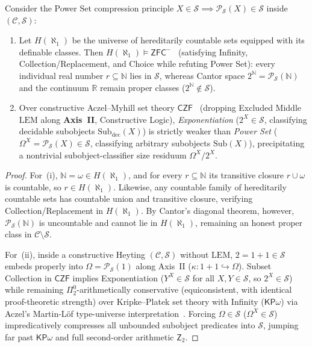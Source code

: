 \begin{proposition}\label{prop:pointillist-continuum}%
%
Consider the Power Set compression principle $X \in \mathcal{S} \implies \mathcal{P}_{\mathcal{S}}(X) \in \mathcal{S}$ inside $(\mathcal{C}, \mathcal{S})$:
\begin{enumerate}[label=\textup{(\roman*)},leftmargin=1.8em]
  \item Let $H(\aleph_1)$ be the universe of hereditarily countable sets equipped with its definable classes. Then $H(\aleph_1) \models \mathsf{ZFC}^-$~\cite{GitmanHamkinsJohnstone16} (satisfying Infinity, Collection/Replacement, and Choice while refuting Power Set): every individual real number $r \subseteq \mathbb{N}$ lies in $\mathcal{S}$, whereas Cantor space $2^{\mathbb{N}} = \mathcal{P}_{\mathcal{S}}(\mathbb{N})$ and the continuum $\mathbb{R}$ remain proper classes ($2^{\mathbb{N}} \notin \mathcal{S}$).
  \item Over constructive Aczel--Myhill set theory $\mathsf{CZF}$~\cite{Aczel78} (dropping Excluded Middle $\mathrm{LEM}$ along \textbf{Axis~II}, Constructive Logic), \emph{Exponentiation} ($2^X \in \mathcal{S}$, classifying decidable subobjects $\mathrm{Sub}_{\mathrm{dec}}(X)$) is strictly weaker than \emph{Power Set} ($\Omega^X = \mathcal{P}_{\mathcal{S}}(X) \in \mathcal{S}$, classifying arbitrary subobjects $\mathrm{Sub}(X)$), precipitating a nontrivial subobject-classifier size residuum $\Omega^X / 2^X$.
\end{enumerate}
\end{proposition}

\begin{proof}
For~(i), $\mathbb{N} = \omega \in H(\aleph_1)$, and for every $r \subseteq \mathbb{N}$ its transitive closure $r \cup \omega$ is countable, so $r \in H(\aleph_1)$. Likewise, any countable family of hereditarily countable sets has countable union and transitive closure, verifying Collection/Replacement in $H(\aleph_1)$. By Cantor's diagonal theorem, however, $\mathcal{P}_{\mathcal{S}}(\mathbb{N})$ is uncountable and cannot lie in $H(\aleph_1)$, remaining an honest proper class in $\mathcal{C} \setminus \mathcal{S}$.

For~(ii), inside a constructive Heyting $(\mathcal{C}, \mathcal{S})$ without $\mathrm{LEM}$, $2 = 1 + 1 \in \mathcal{S}$ embeds properly into $\Omega = \mathcal{P}_{\mathcal{S}}(1)$ along Axis~II ($\kappa : 1 + 1 \hookrightarrow \Omega$). Subset Collection in $\mathsf{CZF}$ implies Exponentiation ($Y^X \in \mathcal{S}$ for all $X, Y \in \mathcal{S}$, so $2^X \in \mathcal{S}$) while remaining $\Pi^0_2$-arithmetically conservative (equiconsistent, with identical proof-theoretic strength) over Kripke--Platek set theory with Infinity ($\mathsf{KP}\omega$) via Aczel's Martin-L\"of type-universe interpretation~\cite{Aczel78}. Forcing $\Omega \in \mathcal{S}$ ($\Omega^X \in \mathcal{S}$) impredicatively compresses all unbounded subobject predicates into $\mathcal{S}$, jumping far past $\mathsf{KP}\omega$ and full second-order arithmetic $\mathsf{Z}_2$.
\end{proof}

